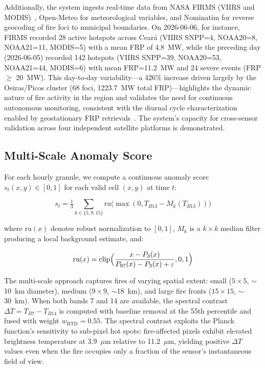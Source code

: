 \documentclass[11pt,twocolumn,a4paper]{article}
\newcommand{\abbrev}[1]{{\small\textsc{#1}}}
\newcommand{\ru}{\text{ru}}
\newcommand{\clip}{\text{clip}}
\begin{document}
Additionally, the system ingests real-time data from \abbrev{NASA} \abbrev{FIRMS} (\abbrev{VIIRS} and \abbrev{MODIS})~\cite{schroeder2014_viiirs,giglio2016_modis}, Open-Meteo for meteorological variables, and Nominatim for reverse geocoding of fire foci to municipal boundaries. On 2026-06-06, for instance, \abbrev{FIRMS} recorded 28 active hotspots across Cear\'{a} (VIIRS SNPP=4, NOAA20=8, NOAA21=11, MODIS=5) with a mean \abbrev{FRP} of 4.8~MW, while the preceding day (2026-06-05) recorded 142 hotspots (VIIRS SNPP=39, NOAA20=53, NOAA21=44, MODIS=6) with mean \abbrev{FRP}=11.2~MW and 24 severe events (\abbrev{FRP} $\ge$ 20~MW). This day-to-day variability---a 426\% increase driven largely by the Oeiras/Picos cluster (68 foci, 1223.7~MW total \abbrev{FRP})---highlights the dynamic nature of fire activity in the region and validates the need for continuous autonomous monitoring, consistent with the diurnal cycle characterization enabled by geostationary \abbrev{FRP} retrievals~\cite{xu2020_goesfrp,zhang2022_goes16}. The system's capacity for cross-sensor validation across four independent satellite platforms is demonstrated.

\subsection{Multi-Scale Anomaly Score}

For each hourly granule, we compute a continuous anomaly score $s_t(x,y) \in [0,1]$ for each valid cell $(x,y)$ at time $t$:

\begin{equation}
s_t = \tfrac13 \sum_{k\in\{5,9,15\}} \!
  \ru\bigl(\max(0, T_{B13} - M_k(T_{B13}))\bigr)
\label{eq:multiscale}
\end{equation}

where $\ru(x)$ denotes robust normalization to $[0,1]$, $M_k$ is a $k \times k$ median filter producing a local background estimate, and:

\begin{equation}
\ru(x) = \clip\Bigl(\frac{x - P_3(x)}{P_{97}(x) - P_3(x) + \varepsilon}, 0, 1\Bigr)
\label{eq:robust_unit}
\end{equation}

The multi-scale approach captures fires of varying spatial extent: small (\(5\times5\), \(\sim\)10~km diameter), medium (\(9\times9\), \(\sim\)18~km), and large fire fronts (\(15\times15\), \(\sim\)30~km). When both bands 7 and 14 are available, the spectral contrast $\Delta T = T_{B7} - T_{B14}$ is computed with baseline removal at the 55th percentile and fused with weight $w_{\text{BTD}} = 0.55$. The spectral contrast exploits the Planck function's sensitivity to sub-pixel hot spots: fire-affected pixels exhibit elevated brightness temperature at 3.9~$\mu$m relative to 11.2~$\mu$m, yielding positive $\Delta T$ values even when the fire occupies only a fraction of the sensor's instantaneous field of view.
\end{document}
